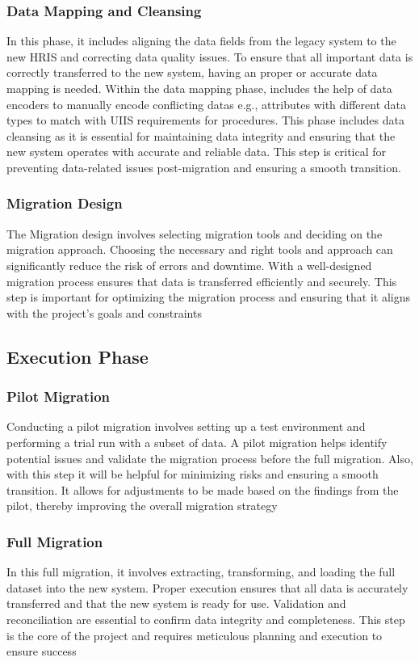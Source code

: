         \subsubsection{Data Mapping and Cleansing}
            In this phase, it includes aligning the data fields from the legacy system to the new HRIS and correcting data quality issues. To ensure that all important data is correctly transferred to the new system, having an proper or accurate data mapping is needed. Within the data mapping phase, includes the help of data encoders to manually encode conflicting datas e.g., attributes with different data types to match with UIIS requirements for procedures. This phase  includes data cleansing as it is essential for maintaining data integrity and ensuring that the new system operates with accurate and reliable data. This step is critical for preventing data-related issues post-migration and ensuring a smooth transition.

        \subsubsection{Migration Design}
            The Migration design involves selecting migration tools  and deciding on the migration approach. Choosing the necessary and right tools and approach can significantly reduce the risk of errors and downtime. With a well-designed migration process ensures that data is transferred efficiently and securely. This step is important for optimizing the migration process and ensuring that it aligns with the project's goals and constraints
        
    \subsection{Execution Phase}
        \subsubsection{Pilot Migration}
            Conducting a pilot migration involves setting up a test environment and performing a trial run with a subset of data. A pilot migration helps identify potential issues and validate the migration process before the full migration. Also, with this step it will be helpful for minimizing risks and ensuring a smooth transition. It allows for adjustments to be made based on the findings from the pilot, thereby improving the overall migration strategy

        \subsubsection{Full Migration}
            In this full migration, it involves extracting, transforming, and loading the full dataset into the new system. Proper execution ensures that all data is accurately transferred and that the new system is ready for use. Validation and reconciliation are essential to confirm data integrity and completeness. This step is the core of the project and requires meticulous planning and execution to ensure success

